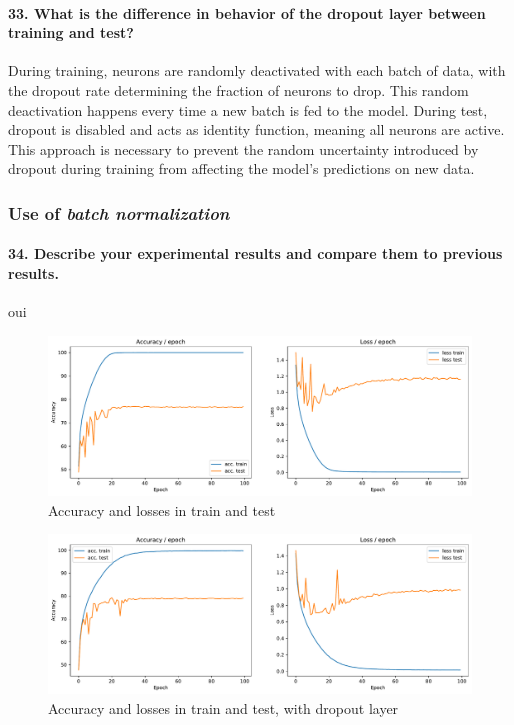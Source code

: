\documentclass{article}
\theoremstyle{plain}%
\theoremstyle{definition}
\theoremstyle{remark}
\begin{document}
\paragraph{33. What is the difference in behavior of the dropout layer between training and test?}
During training, neurons are randomly deactivated with each batch of data, with the dropout rate determining the fraction of neurons to drop. This random deactivation happens every time a new batch is fed to the model. During test, dropout is disabled and acts as identity function, meaning all neurons are active. This approach is necessary to prevent the random uncertainty introduced by dropout during training from affecting the model's predictions on new data.

\subsubsection{Use of \textit{batch normalization}}

\paragraph{34. Describe your experimental results and compare them to previous results.}

oui

\begin{figure}[H]
    \centering
    \includegraphics*[width=\textwidth]{figs/CNN/batchnorm.pdf}
    \caption{Accuracy and losses in train and test}
    \label{fig:batchnorm}
\end{figure}

\begin{figure}[H]
    \centering
    \includegraphics*[width=\textwidth]{figs/CNN/batchnorm_with_dropout.pdf}
    \caption{Accuracy and losses in train and test, with dropout layer}
    \label{fig:batchnorm_with_dropout}
\end{figure}
\end{document}
